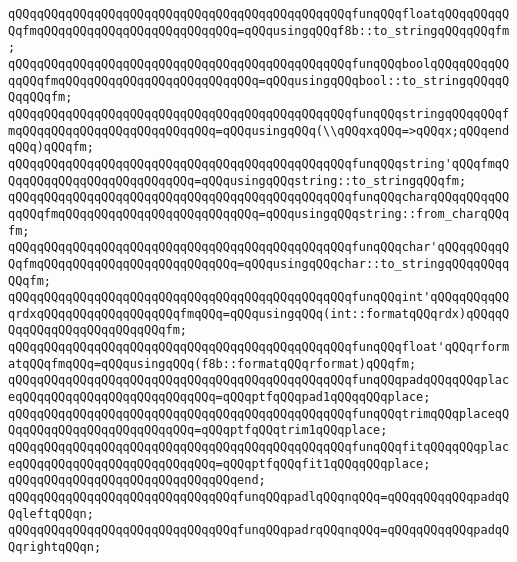 \verb|qQQqqQQqqQQqqQQqqQQqqQQqqQQqqQQqqQQqqQQqqQQqqQQqfunqQQqfloatqQQqqQQqqQQqfmqQQqqQQqqQQqqQQqqQQqqQQqqQQq=qQQqusingqQQqf8b::to_stringqQQqqQQqfm;|\newline
\verb|qQQqqQQqqQQqqQQqqQQqqQQqqQQqqQQqqQQqqQQqqQQqqQQqfunqQQqboolqQQqqQQqqQQqqQQqfmqQQqqQQqqQQqqQQqqQQqqQQqqQQq=qQQqusingqQQqbool::to_stringqQQqqQQqqQQqfm;|\newline
\verb|qQQqqQQqqQQqqQQqqQQqqQQqqQQqqQQqqQQqqQQqqQQqqQQqfunqQQqstringqQQqqQQqfmqQQqqQQqqQQqqQQqqQQqqQQqqQQq=qQQqusingqQQq(\\qQQqxqQQq=>qQQqx;qQQqendqQQq)qQQqfm;|\newline
\verb|qQQqqQQqqQQqqQQqqQQqqQQqqQQqqQQqqQQqqQQqqQQqqQQqfunqQQqstring'qQQqfmqQQqqQQqqQQqqQQqqQQqqQQqqQQq=qQQqusingqQQqstring::to_stringqQQqfm;|\newline
\verb|qQQqqQQqqQQqqQQqqQQqqQQqqQQqqQQqqQQqqQQqqQQqqQQqfunqQQqcharqQQqqQQqqQQqqQQqfmqQQqqQQqqQQqqQQqqQQqqQQqqQQq=qQQqusingqQQqstring::from_charqQQqfm;|\newline
\verb|qQQqqQQqqQQqqQQqqQQqqQQqqQQqqQQqqQQqqQQqqQQqqQQqfunqQQqchar'qQQqqQQqqQQqfmqQQqqQQqqQQqqQQqqQQqqQQqqQQq=qQQqusingqQQqchar::to_stringqQQqqQQqqQQqfm;|\newline
\newline
\verb|qQQqqQQqqQQqqQQqqQQqqQQqqQQqqQQqqQQqqQQqqQQqqQQqfunqQQqint'qQQqqQQqqQQqrdxqQQqqQQqqQQqqQQqqQQqfmqQQq=qQQqusingqQQq(int::formatqQQqrdx)qQQqqQQqqQQqqQQqqQQqqQQqqQQqfm;|\newline
\verb|qQQqqQQqqQQqqQQqqQQqqQQqqQQqqQQqqQQqqQQqqQQqqQQqfunqQQqfloat'qQQqrformatqQQqfmqQQq=qQQqusingqQQq(f8b::formatqQQqrformat)qQQqfm;|\newline
\newline
\verb|qQQqqQQqqQQqqQQqqQQqqQQqqQQqqQQqqQQqqQQqqQQqqQQqfunqQQqpadqQQqqQQqplaceqQQqqQQqqQQqqQQqqQQqqQQqqQQq=qQQqptfqQQqpad1qQQqqQQqplace;|\newline
\verb|qQQqqQQqqQQqqQQqqQQqqQQqqQQqqQQqqQQqqQQqqQQqqQQqfunqQQqtrimqQQqplaceqQQqqQQqqQQqqQQqqQQqqQQqqQQq=qQQqptfqQQqtrim1qQQqplace;|\newline
\verb|qQQqqQQqqQQqqQQqqQQqqQQqqQQqqQQqqQQqqQQqqQQqqQQqfunqQQqfitqQQqqQQqplaceqQQqqQQqqQQqqQQqqQQqqQQqqQQq=qQQqptfqQQqfit1qQQqqQQqplace;|\newline
\verb|qQQqqQQqqQQqqQQqqQQqqQQqqQQqqQQqend;|\newline
\newline
\verb|qQQqqQQqqQQqqQQqqQQqqQQqqQQqqQQqfunqQQqpadlqQQqnqQQq=qQQqqQQqqQQqpadqQQqleftqQQqn;|\newline
\verb|qQQqqQQqqQQqqQQqqQQqqQQqqQQqqQQqfunqQQqpadrqQQqnqQQq=qQQqqQQqqQQqpadqQQqrightqQQqn;|\newline
